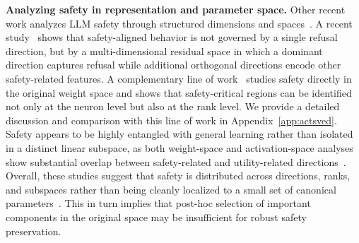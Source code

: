 \documentclass{article}
\newcommand{\kms}[1]{{\leavevmode\color{blue}[MS: #1]}}
\newcommand{\wjb}[1]{{\leavevmode\color{orange}[jb: #1]}}
\begin{document}




\textbf{Analyzing safety in representation and parameter space.}
Other recent work analyzes LLM safety through structured dimensions and spaces~\citep{zou2025representationengineeringtopdownapproach, geometry_cone}. A recent study~\citep{hidden_dimensions} shows that safety-aligned behavior is not governed by a single refusal direction, but by a multi-dimensional residual space in which a dominant direction captures refusal while additional orthogonal directions encode other safety-related features. %
A complementary line of work~\citep{assessing_the_brittleness} studies safety directly in the original weight space and shows that safety-critical regions can be identified not only at the neuron level but also at the rank level. We provide a detailed discussion and comparison with this line of work in Appendix~\ref{app:actsved}. %
Safety appears to be highly entangled with general learning rather than isolated in a distinct linear subspace, as both weight-space and activation-space analyses show substantial overlap between safety-related and utility-related directions~\citep{Safety_subspace_arenot_linearly_distinct}. Overall, these studies suggest that safety is distributed across directions, ranks, and subspaces rather than being cleanly localized to a small set of canonical parameters~\citep{li2025safety, geometry_cone}. This in turn implies that post-hoc selection of important components in the original space may be insufficient for robust safety preservation.
\end{document}
